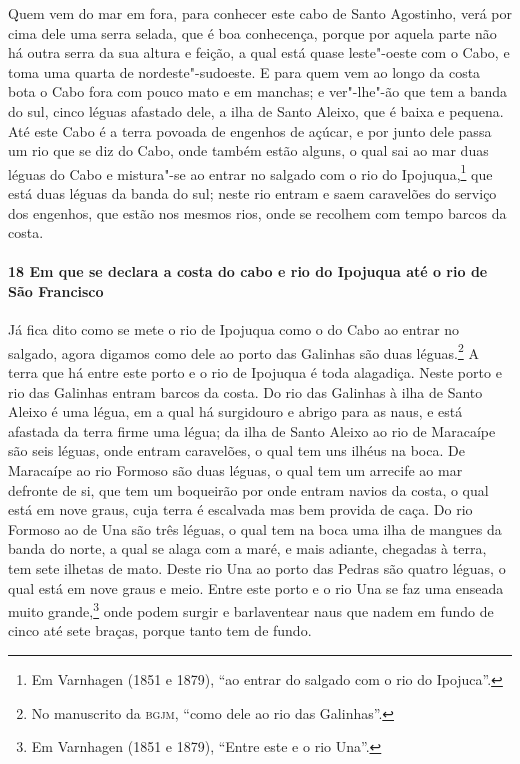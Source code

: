 \begin{linenumbers}
Quem vem do mar em fora, para conhecer este cabo de Santo Agostinho, verá por cima dele
uma serra selada, que é boa conhecença, porque por aquela parte não há outra serra da sua
altura e feição, a qual está quase leste"-oeste com o Cabo, e toma uma quarta de
nordeste"-sudoeste. E para quem vem ao longo da costa bota o Cabo fora com pouco mato e em
manchas; e ver"-lhe"-ão que tem a banda do sul, cinco léguas afastado dele, a ilha de Santo
Aleixo, que é baixa e pequena. Até este Cabo é a terra povoada de engenhos de açúcar, e
por junto dele passa um rio que se diz do Cabo, onde também estão alguns, o qual sai ao
mar duas léguas do Cabo e mistura"-se ao entrar no salgado com o rio do Ipojuqua,\footnote{
Em Varnhagen (1851 e 1879), ``ao entrar do salgado com o rio do Ipojuca''.} que está duas
léguas da banda do sul; neste rio entram e saem caravelões do serviço dos engenhos, que
estão nos mesmos rios, onde se recolhem com tempo barcos da costa.

\paragraph{18 Em que se declara a costa do cabo e rio do Ipojuqua até o rio de São
Francisco} \quad
Já fica dito como se mete o rio de Ipojuqua como o do Cabo ao entrar no salgado, agora
digamos como dele ao porto das Galinhas são duas léguas.\footnote{ No manuscrito da
\textsc{bgjm}, ``como dele ao rio das Galinhas''.} A terra que há entre este porto e o rio
de Ipojuqua é toda alagadiça. Neste porto e rio das Galinhas entram barcos da costa. Do
rio das Galinhas à ilha de Santo Aleixo é uma légua, em a qual há surgidouro e abrigo para
as naus, e está afastada da terra firme uma légua; da ilha de Santo Aleixo ao rio de
Maracaípe são seis léguas, onde entram caravelões, o qual tem uns ilhéus na boca. De
Maracaípe ao rio Formoso são duas léguas, o qual tem um arrecife ao mar defronte de si,
que tem um boqueirão por onde entram navios da costa, o qual está em nove graus, cuja
terra é escalvada mas bem provida de caça. Do rio Formoso ao de Una são três léguas, o
qual tem na boca uma ilha de mangues da banda do norte, a qual se alaga com a maré, e mais
adiante, chegadas à terra, tem sete ilhetas de mato. Deste rio Una ao porto das Pedras são
quatro léguas, o qual está em nove graus e meio. Entre este porto e o rio Una se faz uma
enseada muito grande,\footnote{ Em Varnhagen (1851 e 1879), ``Entre este e o rio Una''.}
onde podem surgir e barlaventear naus que nadem em fundo de cinco até sete braças, porque
tanto tem de fundo.


\end{linenumbers}
